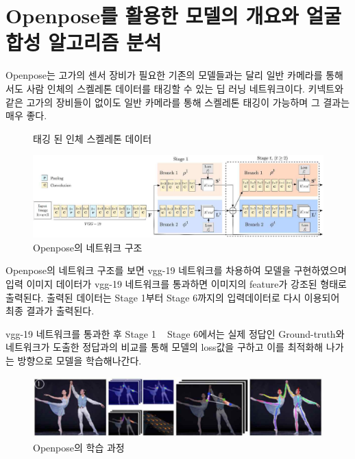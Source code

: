 \documentclass{oblivoir}
\begin{document}
\section{Openpose를 활용한 모델의 개요와 얼굴 합성 알고리즘 분석}

Openpose는 고가의 센서 장비가 필요한 기존의 모델들과는 달리 일반 카메라를 통해서도 사람 인체의 스켈레톤 데이터를 태깅할 수 있는 딥 러닝 네트워크이다. 키넥트와 같은 고가의 장비들이 없이도 일반 카메라를 통해 스켈레톤 태깅이 가능하며 그 결과는 매우 좋다.
\begin{figure}[h!]
\centering
\caption{태깅 된 인체 스켈레톤 데이터}
\end{figure}
\begin{figure}[h!]
  \centering
    \includegraphics{pic/chp3/img763}
  \caption{Openpose의 네트워크 구조\cite{reference10}}
\end{figure}


Openpose의 네트워크 구조를 보면 vgg-19 네트워크를 차용하여 모델을 구현하였으며 입력 이미지 데이터가 vgg-19 네트워크를 통과하면 이미지의 feature가 강조된 형태로 출력된다. 출력된 데이터는 Stage 1부터 Stage 6까지의 입력데이터로 다시 이용되어 최종 결과가 출력된다.

vgg-19 네트워크를 통과한 후 Stage 1 ~ Stage 6에서는 실제 정답인 Ground-truth와 네트워크가 도출한 정답과의 비교를 통해 모델의 loss값을 구하고 이를 최적화해 나가는 방향으로 모델을 학습해나간다.

\begin{figure}[h!]
  \centering
    \includegraphics{pic/chp3/img765}
  \caption{Openpose의 학습 과정\cite{reference10}}
\end{figure}
\end{document}
